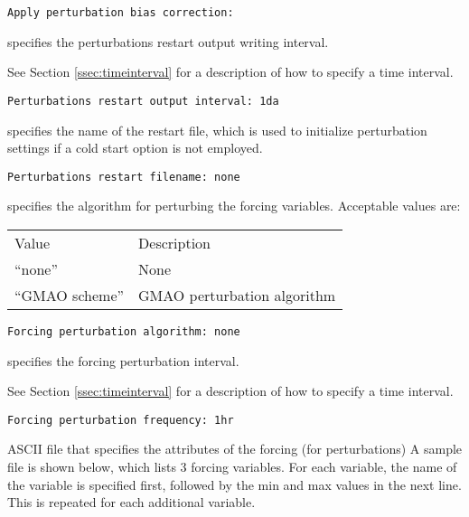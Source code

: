  \begin{Verbatim}[frame=single]
Apply perturbation bias correction:
 \end{Verbatim}

 
  specifies the
 perturbations restart output writing interval.

 See Section \ref{ssec:timeinterval} for a description
 of how to specify a time interval.
 

 \begin{Verbatim}[frame=single]
Perturbations restart output interval: 1da
 \end{Verbatim}

 
  specifies the name of the 
 restart file, which is used to initialize perturbation settings
 if a cold start option is not employed. 
 

 \begin{Verbatim}[frame=single]
Perturbations restart filename: none
 \end{Verbatim}

  specifies the algorithm for
 perturbing the forcing variables.
 Acceptable values are: 

 \begin{tabular}{ll}
 Value           & Description                 \\
 ``none''        & None                        \\
 ``GMAO scheme'' & GMAO perturbation algorithm \\
 \end{tabular}
 

 \begin{Verbatim}[frame=single]
Forcing perturbation algorithm: none
 \end{Verbatim}

 
  specifies the forcing
 perturbation interval.

 See Section \ref{ssec:timeinterval} for a description
 of how to specify a time interval.
 

 \begin{Verbatim}[frame=single]
Forcing perturbation frequency: 1hr
 \end{Verbatim}

 
  ASCII file that
 specifies the attributes of the forcing (for perturbations)
 A sample file is shown below, which lists 3 forcing 
 variables. For each variable, the name of the variable is 
 specified first, followed by the min and max values in the 
 next line. This is repeated for each additional variable.  

